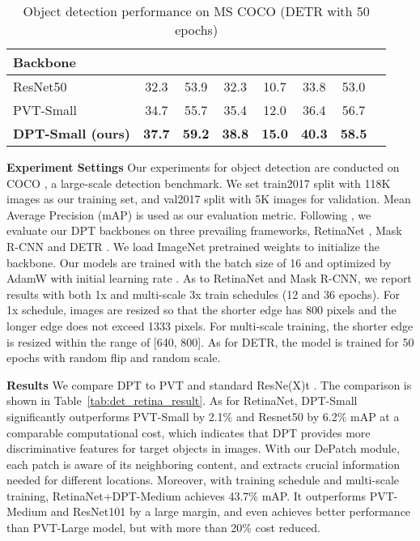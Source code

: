 \documentclass[sigconf,screen]{acmart}
\begin{document}
\begin{table}
  \caption{Object detection performance on MS COCO (DETR with 50 epochs)}
  \label{tab:det_detr_result}
  \begin{tabular}{lccccccc}
    \toprule
    Backbone &  &  &  &  &  & \\
    \midrule
    ResNet50 \cite{resnet}   & 32.3 & 53.9 & 32.3 & 10.7 & 33.8 & 53.0\\
    PVT-Small \cite{pvt}     & 34.7 & 55.7 & 35.4 & 12.0 & 36.4 & 56.7\\
    \textbf{DPT-Small (ours)}& \textbf{37.7} & \textbf{59.2} & \textbf{38.8} & \textbf{15.0} & \textbf{40.3} & \textbf{58.5}\\
  \bottomrule
\end{tabular}
\end{table}

\textbf{Experiment Settings} Our experiments for object detection are conducted on COCO \cite{coco}, a large-scale detection benchmark. We set train2017 split with 118K images as our training set, and val2017 split with 5K images for validation. Mean Average Precision (mAP) is used as our evaluation metric. Following \cite{pvt}, we evaluate our DPT backbones on three prevailing frameworks, RetinaNet \cite{retina}, Mask R-CNN \cite{maskrcnn} and DETR \cite{detr}. We load ImageNet pretrained weights to initialize the backbone. Our models are trained with the batch size of 16 and optimized by AdamW \cite{adamw} with initial learning rate . As to RetinaNet and Mask R-CNN, we report results with both 1x and multi-scale 3x train schedules (12 and 36 epochs). For 1x schedule, images are resized so that the shorter edge has 800 pixels and the longer edge does not exceed 1333 pixels. For multi-scale training, the shorter edge is resized within the range of [640, 800]. As for DETR, the model is trained for 50 epochs with random flip and random scale.

\textbf{Results} We compare DPT to PVT \cite{pvt} and standard ResNe(X)t \cite{resnet,resnext}. The comparison is shown in Table~\ref{tab:det_retina_result}. As for RetinaNet, DPT-Small significantly outperforms PVT-Small by 2.1\% and Resnet50 by 6.2\% mAP at a comparable computational cost, which indicates that DPT provides more discriminative features for target objects in images. With our DePatch module, each patch is aware of its neighboring content, and extracts crucial information needed for different locations. Moreover, with  training schedule and multi-scale training, RetinaNet+DPT-Medium achieves 43.7\% mAP. It outperforms PVT-Medium and ResNet101 by a large margin, and even achieves better performance than PVT-Large model, but with more than 20\% cost reduced. 
\end{document}
